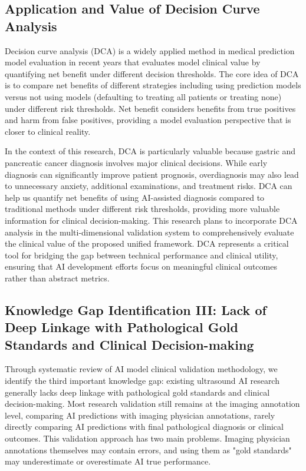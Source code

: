 \subsection{Application and Value of Decision Curve Analysis}

Decision curve analysis (DCA) is a widely applied method in medical prediction model evaluation in recent years that evaluates model clinical value by quantifying net benefit under different decision thresholds. The core idea of DCA is to compare net benefits of different strategies including using prediction models versus not using models (defaulting to treating all patients or treating none) under different risk thresholds. Net benefit considers benefits from true positives and harm from false positives, providing a model evaluation perspective that is closer to clinical reality.

In the context of this research, DCA is particularly valuable because gastric and pancreatic cancer diagnosis involves major clinical decisions. While early diagnosis can significantly improve patient prognosis, overdiagnosis may also lead to unnecessary anxiety, additional examinations, and treatment risks. DCA can help us quantify net benefits of using AI-assisted diagnosis compared to traditional methods under different risk thresholds, providing more valuable information for clinical decision-making. This research plans to incorporate DCA analysis in the multi-dimensional validation system to comprehensively evaluate the clinical value of the proposed unified framework. DCA represents a critical tool for bridging the gap between technical performance and clinical utility, ensuring that AI development efforts focus on meaningful clinical outcomes rather than abstract metrics.

\subsection{Knowledge Gap Identification III: Lack of Deep Linkage with Pathological Gold Standards and Clinical Decision-making}

Through systematic review of AI model clinical validation methodology, we identify the third important knowledge gap: existing ultrasound AI research generally lacks deep linkage with pathological gold standards and clinical decision-making. Most research validation still remains at the imaging annotation level, comparing AI predictions with imaging physician annotations, rarely directly comparing AI predictions with final pathological diagnosis or clinical outcomes. This validation approach has two main problems. Imaging physician annotations themselves may contain errors, and using them as "gold standards" may underestimate or overestimate AI true performance.

